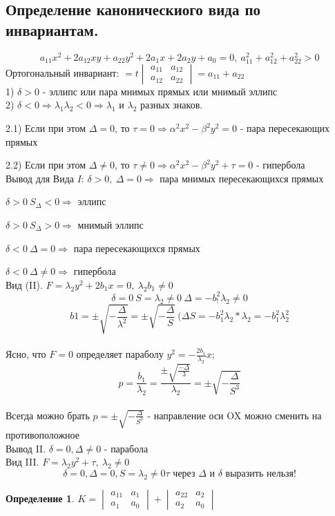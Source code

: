 \documentclass{article}
\theoremstyle{definition}
\newtheorem{definition}{Определение}
\begin{document}
\subsection{Определение каноническиого вида по инвариантам.}
$$a_{11} x^2 + 2 a_{12} x y + a_{22} y^2 + 2 a_1 x + 2 a_2 y + a_0 = 0 , \ a_{11}^2 + a_{12}^2 + a_{22}^2 > 0$$
Ортогональный инвариант:
$ = t
\begin{vmatrix}
a_{11} & a_{12}\\
a_{12} & a_{22}
\end{vmatrix} = a_{11} + a_{22}$
\\ 1) $\delta > 0$ - эллипс или пара мнимых прямых или мнимый эллипс
\\ 2) $\delta < 0 \Rightarrow \lambda_1 \lambda_2 < 0 \Rightarrow \lambda_1 $ и $\lambda_2$ разных знаков.

2.1) Если при этом $\Delta = 0$, то $\tau = 0 \Rightarrow \alpha^2 x^2 - \beta^2 y^2 = 0$ - пара пересекающих прямых

2.2) Если при этом $\Delta \neq 0$, то $\tau \neq 0 \Rightarrow \alpha^2 x^2 - \beta^2 y^2 + \tau = 0$ - гипербола
\\ Вывод для Вида $I$:
$\delta > 0, \ \Delta = 0 \Rightarrow $ пара мнимых пересекающихся прямых

$\delta > 0 \ S_\Delta < 0 \Rightarrow$ эллипс

$\delta > 0 \ S_\Delta > 0 \Rightarrow$ мнимый эллипс

$\delta < 0 \ \Delta = 0 \Rightarrow$ пара пересекающихся прямых

$\delta < 0 \ \Delta \neq 0 \Rightarrow$ гипербола
\\ Вид (II). $F = \lambda_2 y^2 + 2 b_1 x = 0, \ \lambda_2 b_1 \neq 0$
$$\delta = 0 \ S = \lambda_2 \neq 0 \ \Delta = -b_!^2 \lambda_2 \neq 0 $$
$$b1 = \pm \sqrt{-\frac{\Delta}{\lambda^2}} = \pm \sqrt{-\frac{\Delta}{S}} \ (\Delta S = -b_1^2 \lambda_2 * \lambda_2 = - b_1^2 \lambda_2^2 $$
\\ Ясно, что $F = 0$ определяет параболу $y^2 = -\frac{2 b_1}{\lambda_2} x$;
$$p = \frac{b_1}{\lambda_2} = \frac{\pm \sqrt{\frac{-\Delta}{3}}}{\lambda_2} = \pm \sqrt{-\frac{\Delta}{S^3}} $$
\\ Всегда можно брать $p = \pm \sqrt{-\frac{\Delta}{S^3}} $ - направление оси OX можно сменить на противоположное
\\ Вывод II. $\delta = 0, \Delta \neq 0$ - парабола
\\ Вид III. $F = \lambda_2 y^2 + \tau, \ \lambda_2 \neq 0$
$$\delta = 0, \Delta = 0, S = \lambda_2 \neq 0 \tau \textrm{ через } \Delta \textrm{ и } \delta \textrm{ выразить нельзя!} $$
\begin{definition}
$K = \begin{vmatrix}
a_{11} & a_1 \\
a_1 & a_0
\end{vmatrix} + \begin{vmatrix}
a_{22} & a_2 \\
a_2 & a_0
\end{vmatrix}$
\end{definition}
\end{document}
